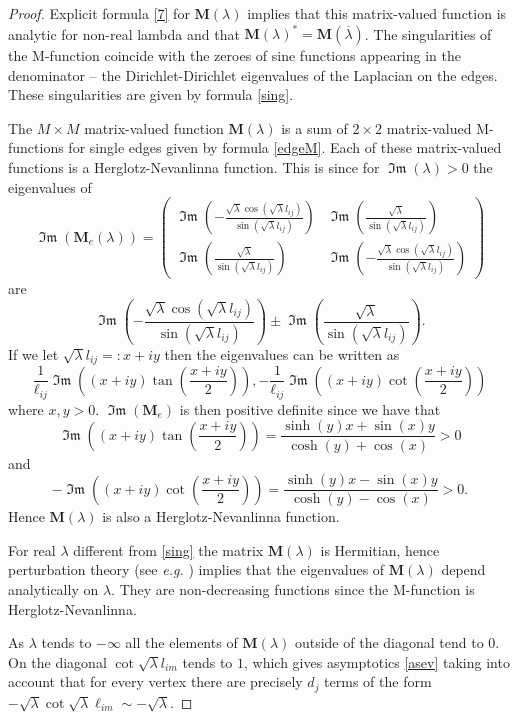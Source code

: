 \documentclass{amsart}
\theoremstyle{definition}
\theoremstyle{remark}
\numberwithin{equation}{section}
\DeclareMathOperator{\im}{\mathfrak{Im}}
\begin{document}
\begin{proof}
Explicit formula \eqref{7}  for  $\mathbf{M}(\lambda)$ implies that this matrix-valued function is analytic for non-real lambda and that $\mathbf{M}(\lambda)^*=\mathbf{M}(\overline{\lambda})$.
The singularities of the M-function coincide with the zeroes of sine functions appearing in the denominator -- the Dirichlet-Dirichlet
eigenvalues of the Laplacian on the edges. These singularities are given by formula \eqref{sing}.


The $ M \times M $ matrix-valued function $\mathbf{M}(\lambda)$  is a sum of $ 2 \times 2 $ matrix-valued  M-functions for single edges 
given by formula \eqref{edgeM}. Each of these matrix-valued functions is a Herglotz-Nevanlinna function. This is since for $\im(\lambda)>0$ the eigenvalues of 
$$\im(\mathbf{M}_e(\lambda))
= 
\begin{pmatrix}
\im\left(-\frac{\sqrt{\lambda }\cos(\sqrt{\lambda }l_{ij})}{\sin(\sqrt{\lambda }l_{ij}) }\right) &
\im\left(\frac{\sqrt{\lambda }}{\sin(\sqrt{\lambda }l_{ij}) }\right)\\[3mm]
\im\left(\frac{\sqrt{\lambda }}{\sin(\sqrt{\lambda }l_{ij}) }\right) &
\im\left(-\frac{\sqrt{\lambda }\cos(\sqrt{\lambda }l_{ij})}{\sin(\sqrt{\lambda }l_{ij}) }\right)
\end{pmatrix}
$$ are 
$$\im\left(-\frac{\sqrt{\lambda }\cos(\sqrt{\lambda }l_{ij})}{\sin(\sqrt{\lambda }l_{ij}) }\right)\pm \im\left(\frac{\sqrt{\lambda }}{\sin(\sqrt{\lambda }l_{ij}) }\right). $$
If we let $\sqrt{\lambda}l_{ij}=:x+iy$ then the eigenvalues can be written as 
$$\frac{1}{\ell_{ij}}\im\left((x+iy)\tan(\frac{x+iy}{2})\right), -\frac{1}{\ell_{ij}}\im\left((x+iy)\cot(\frac{x+iy}{2})\right)$$
where $x,y>0$. $\im(\mathbf{M}_e)$ is then positive definite since we have that 
$$\im\left((x+iy)\tan(\frac{x+iy}{2})\right)=\frac{\sinh(y)x+\sin(x)y}{\cosh(y)+\cos(x)}>0$$
and
$$-\im\left((x+iy)\cot(\frac{x+iy}{2})\right)=\frac{\sinh(y)x-\sin(x)y}{\cosh(y)-\cos(x)}>0.$$
 Hence $\mathbf{M}(\lambda)$ is also a Herglotz-Nevanlinna function. 
 
 For real $ \lambda $ different from \eqref{sing}  the matrix $\mathbf{M}(\lambda) $ is Hermitian, hence perturbation theory  (see {\it e.g.} \cite[Theorem 6.1]{Kato}) implies
 that the eigenvalues of $ \mathbf M(\lambda) $ depend analytically on $ \lambda $. They are non-decreasing functions since the M-function is Herglotz-Nevanlinna. 
 


 As $\lambda$ tends to $-\infty$ all the elements of $\mathbf{M}(\lambda)$ outside of the diagonal tend to $0$.
 On the diagonal $ \cot \sqrt{\lambda} l_{im} $ tends to $1$, which gives 
 asymptotics \eqref{asev}  taking into account that for every vertex there are precisely $ d_j $ terms  of the form
 $  - \sqrt{\lambda} \cot \sqrt{\lambda} \ell_{im}  \sim - \sqrt{\lambda}$.
\end{proof}
\end{document}
